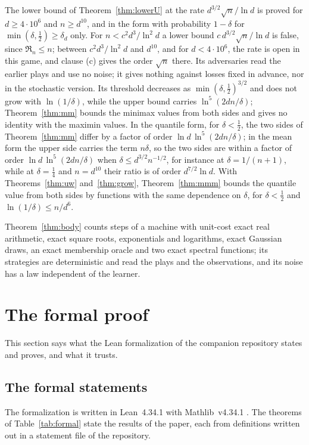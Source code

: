 \documentclass[11pt]{amsart}
\theoremstyle{definition}
\numberwithin{equation}{section}
\newcommand{\Reg}{\mathfrak{R}}
\begin{document}
The lower bound of Theorem~\ref{thm:lowerU} at the rate $d^{3/2}\sqrt n/\ln d$ is proved for $d\ge4\cdot10^6$ and $n\ge d^{10}$, and in the form with probability $1-\delta$ for $\min(\delta,\frac12)\ge\delta_d$ only. For $n<c^2d^3/\ln^2d$ a lower bound $c\,d^{3/2}\sqrt n/\ln d$ is false, since $\Reg_n\le n$; between $c^2d^3/\ln^2d$ and $d^{10}$, and for $d<4\cdot10^6$, the rate is open in this game, and clause (c) gives the order $\sqrt n$ there. Its adversaries read the earlier plays and use no noise; it gives nothing against losses fixed in advance, nor in the stochastic version. Its threshold decreases as $\min(\delta,\frac12)^{3/2}$ and does not grow with $\ln(1/\delta)$, while the upper bound carries $\ln^5(2dn/\delta)$; Theorem~\ref{thm:mm} bounds the minimax values from both sides and gives no identity with the maximin values. In the quantile form, for $\delta<\frac12$, the two sides of Theorem~\ref{thm:mm} differ by a factor of order $\ln d\,\ln^5(2dn/\delta)$; in the mean form the upper side carries the term $n\delta$, so the two sides are within a factor of order $\ln d\,\ln^5(2dn/\delta)$ when $\delta\le d^{3/2}n^{-1/2}$, for instance at $\delta=1/(n+1)$, while at $\delta=\frac14$ and $n=d^{10}$ their ratio is of order $d^{7/2}\ln d$. With Theorems~\ref{thm:uw} and~\ref{thm:grow}, Theorem~\ref{thm:mmm} bounds the quantile value from both sides by functions with the same dependence on $\delta$, for $\delta<\frac12$ and $\ln(1/\delta)\le n/d^6$.

Theorem~\ref{thm:body} counts steps of a machine with unit-cost exact real arithmetic, exact square roots, exponentials and logarithms, exact Gaussian draws, an exact membership oracle and two exact spectral functions; its strategies are deterministic and read the plays and the observations, and its noise has a law independent of the learner.

\section{The formal proof}\label{sec:formal}

This section says what the Lean formalization of the companion repository \cite{AdvBcoLean} states and proves, and what it trusts.

\subsection{The formal statements}\label{sec:formal-lean}
The formalization is written in Lean~4.34.1 \cite{Lean4} with Mathlib~v4.34.1 \cite{Mathlib20}. The theorems of Table~\ref{tab:formal} state the results of the paper, each from definitions written out in a statement file of the repository.
\end{document}
